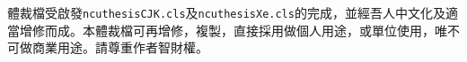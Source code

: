 \begin{acknowledge} 

體裁檔受啟發{\tt ncuthesisCJK.cls}及{\tt ncuthesisXe.cls}的完成，並經吾人中文化及適當增修而成。本體裁檔可再增修，複製，直接採用做個人用途，或單位使用，唯不可做商業用途。請尊重作者智財權。
\end{acknowledge} 